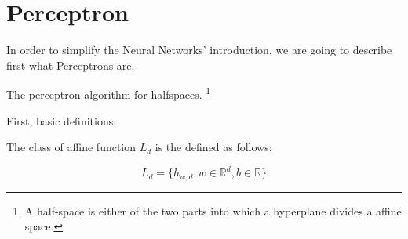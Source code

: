 \documentclass{book}
\begin{document}
\chapter{Perceptron}

In order to simplify the Neural Networks' introduction, we are going to describe first 
what Perceptrons are. 

The perceptron algorithm for halfspaces.
 \footnote{A half-space is either of the two parts into which a hyperplane divides a affine space. } 


 First, basic definitions: 

 The class of affine function  $L_d$ is the defined as follows:

 $$L_d = \{ h_{w,d}: w \in \mathbb{R}^d, b \in \mathbb R\}$$
\end{document}
